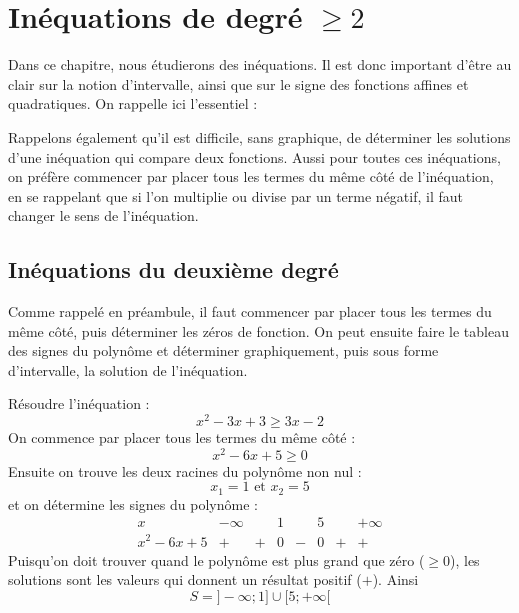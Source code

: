 \chapter{Inéquations de degré $\geq 2$}

Dans ce chapitre, nous étudierons des inéquations. Il est donc important d'être au clair sur la notion d'intervalle, ainsi que sur le signe des fonctions affines et quadratiques. On rappelle ici l'essentiel :

\vspace{5mm}


\vspace{5mm}

Rappelons également qu'il est difficile, sans graphique, de déterminer les solutions d'une inéquation qui compare deux fonctions. Aussi pour toutes ces inéquations, on préfère commencer par placer tous les termes du même côté de l'inéquation, en se rappelant que si l'on multiplie ou divise par un terme négatif, il faut changer le sens de l'inéquation.

\section{Inéquations du deuxième degré}

Comme rappelé en préambule, il faut commencer par placer tous les termes du même côté, puis déterminer les zéros de fonction. On peut ensuite faire le tableau des signes du polynôme et déterminer graphiquement, puis sous forme d'intervalle, la solution de l'inéquation.

\begin{exemple}
Résoudre l'inéquation :
$$
x^2 -3x +3 \geq 3x-2
$$
On commence par placer tous les termes du même côté :
$$
x^2 -6x +5 \geq 0
$$
Ensuite on trouve les deux racines du polynôme non nul :
$$
x_1 = 1 \mbox{ et } x_2 = 5
$$
et on détermine les signes du polynôme :
$$
\begin{array}{l|l|l|l|l|l|l|l}
x & -\infty &  & 1 & & 5 & & +\infty\\
\hline
x^2-6x+5 & + & + & 0 & - & 0 & + & + 
\end{array}
$$
Puisqu'on doit trouver quand le polynôme est plus grand que zéro ($\geq 0$), les solutions sont les valeurs qui donnent un résultat positif ($+$). Ainsi 
$$
S=]-\infty ; 1] \cup [5;+\infty[
$$
\end{exemple}

